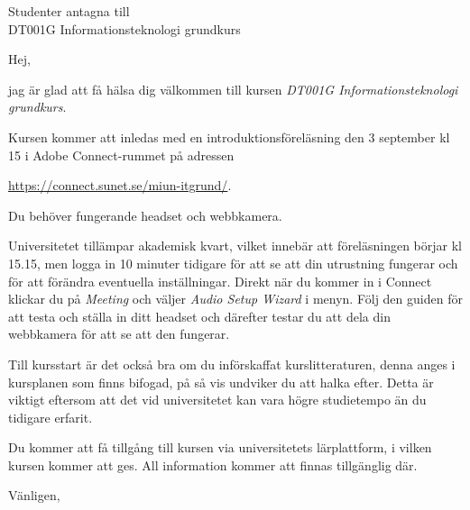 \documentclass[a4paper]{miunlett}
\institute{Mittuniversitetet}
\date{Sundsvall, den 7 augusti 2012}
\begin{document}
	\begin{letter}{
		Studenter antagna till\\
		DT001G Informationsteknologi grundkurs
	}
		\opening{Hej,}

		jag är glad att få hälsa dig välkommen till kursen \emph{DT001G 
		Informationsteknologi grundkurs}.

		Kursen kommer att inledas med en introduktionsföreläsning den 3 september 
		kl 15 i Adobe Connect-rummet på adressen
		\begin{center}
			\url{https://connect.sunet.se/miun-itgrund/}.
		\end{center}
		Du behöver fungerande headset och webbkamera.

		Universitetet tillämpar akademisk kvart, vilket innebär att föreläsningen 
		börjar kl 15.15, men logga in 10 minuter tidigare för att se att din 
		utrustning fungerar och för att förändra eventuella inställningar.
		Direkt när du kommer in i Connect klickar du på \emph{Meeting} och väljer 
		\emph{Audio Setup Wizard} i menyn.
		Följ den guiden för att testa och ställa in ditt headset och därefter 
		testar du att dela din webbkamera för att se att den fungerar.

		Till kursstart är det också bra om du införskaffat kurslitteraturen, denna 
		anges i kursplanen som finns bifogad, på så vis undviker du att halka 
		efter.
		Detta är viktigt eftersom att det vid universitetet kan vara högre 
		studietempo än du tidigare erfarit.

		Du kommer att få tillgång till kursen via universitetets lärplattform, 
		i vilken kursen kommer att ges.
		All information kommer att finnas tillgänglig där.


		\closing{Vänligen,}


		
	\end{letter}
\end{document}
